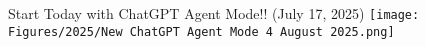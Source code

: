 \documentclass{beamer}
\begin{document}



\begin{frame}[plain]{Start Today with ChatGPT Agent Mode!! (July 17, 2025)}
    \vfill %
    \centering %
    \texttt{[image: Figures/2025/New ChatGPT Agent Mode 4 August 2025.png]}

    \vfill %
\end{frame}




\end{document}
